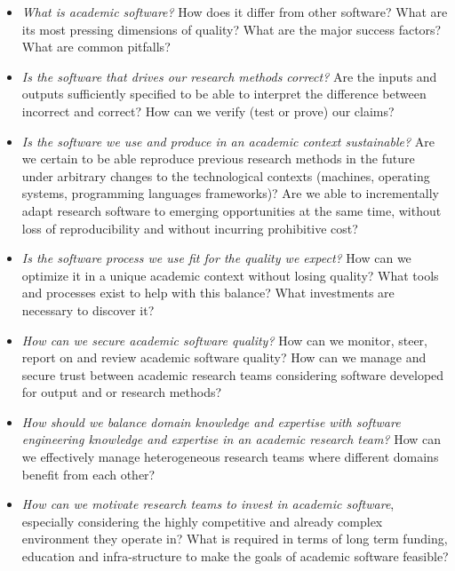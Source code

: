 \documentclass[a4paper,UKenglish]{dagman}
\begin{document}
\begin{itemize}
\item \emph{What is academic software?} How does it differ from other software? What are its most pressing dimensions of quality? What are the major success factors? What are common pitfalls?
\item \emph{Is the software that drives our research methods correct?} Are the inputs and outputs sufficiently specified to be able to interpret the difference between incorrect and correct? How can we verify (test or prove) our claims?
\item \emph{Is the software we use and produce in an academic context sustainable?}
Are we certain to be able reproduce previous research methods in the future under arbitrary changes to the technological contexts (machines, operating systems, programming languages frameworks)? Are we able to incrementally adapt research software to emerging opportunities at the same time, without loss of reproducibility and without incurring prohibitive cost?
\item \emph{Is the software process we use fit for the quality we expect?} How can we optimize it in a unique academic context without losing quality? What tools and processes exist to help with this balance? What investments are necessary to discover it?
\item \emph{How can we secure academic software quality?} How can we monitor, steer, report on and review academic software quality? How can we manage and secure trust between academic research teams considering software developed for output and or research methods?
\item \emph{How should we balance domain knowledge and expertise with software engineering knowledge and expertise in an academic research team?} How can we effectively manage heterogeneous research teams where different domains benefit from each other?   
\item \emph{How can we motivate research teams to invest in academic software}, especially considering the highly competitive and already complex environment they operate in?
What is required in terms of long term funding, education and infra-structure to make the goals of academic software feasible?
\end{itemize}
\end{document}
